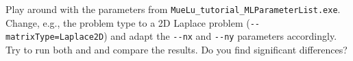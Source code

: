 \documentclass[10pt,fleqn]{book}
\begin{document}
\begin{exercise}
Play around with the parameters from \verb|MueLu_tutorial_MLParameterList.exe|. Change, e.g., the problem type to a 2D Laplace problem (\verb|--matrixType=Laplace2D|) and adapt the \verb|--nx| and \verb|--ny| parameters accordingly.
Try to run both \ml and \muelu and compare the results. Do you find significant differences?
\end{exercise}




%
%
%
\end{document}
